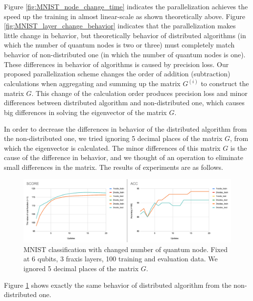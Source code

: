 \par Figure \ref{fig:MNIST_node_change_time} indicates the parallelization achieves the speed up the training in almost linear-scale as shown theoretically above. Figure \ref{fig:MNIST_layer_change_behavior} indicates that the parallelization makes little change in behavior, but theoretically behavior of distributed algorithms (in which the number of quantum nodes is two or three) must completely match behavior of non-distributed one (in which the number of quantum nodes is one). These differences in behavior of algorithms is caused by precision loss. Our proposed parallelization scheme changes the order of addition (subtraction) calculations when aggregating and summing up the matrix $G^{(i)}$ to construct the matrix $G$. This change of the calculation order produces precision loss and minor differences between distributed algorithm and non-distributed one, which causes big differences in solving the eigenvector of the matrix $G$. 

\par In order to decrease the differences in behavior of the distributed algorithm from the non-distributed one, we tried ignoring 5 decimal places of the matrix $G$, from which the eigenvector is calculated. The minor differences of this matrix $G$ is the cause of the difference in behavior, and we thought of an operation to eliminate small differences in the matrix. The results of experiments are as follows.

\begin{figure}[H]
    \centering
    \includegraphics[keepaspectratio, scale=0.54]{experiment/figure/ignore_MNIST_node_change.png}
    \caption{MNIST classification with changed number of quantum node. Fixed at 6 qubits, 3 fraxis layers, 100 training and evaluation data. We ignored 5 decimal places of the matrix $G$.}
    \label{fig:ignore_MNIST_node_change}
\end{figure}

\par Figure \ref{fig:ignore_MNIST_node_change} shows exactly the same behavior of distributed algorithm from the non-distributed one.